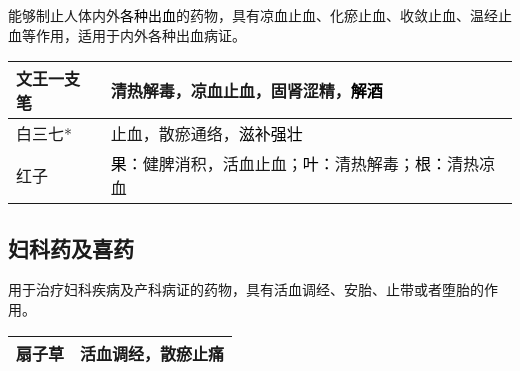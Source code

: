 \documentclass[cn,hazy,black,12pt,normal,founder]{elegantnote}
\newcommand{\redt}[1]{\textcolor{black}{{}#1}}      %
\begin{document}
能够制止人体内外\redt{各种出血}的药物，具有凉血止血、化瘀止血、收敛止血、温经止血等作用，适用于内外各种出血病证。

\begin{table}[H]
  \begin{tabular}{|l|l|}
  \hline
  文王一支笔 & 清热解毒，凉血止血，固肾涩精，\redt{解酒}    \\ \hline
  白三七* & 止血，散瘀通络，\redt{滋补强壮}   \\   \hline
  红子 & \redt{果：}健脾消积，活血止血；\redt{叶：}清热解毒；\redt{根：}清热凉血  \\  \hline
  \end{tabular}
\end{table}

\subsection{妇科药及喜药}

用于治疗妇科疾病及产科病证的药物，具有活血调经、安胎、止带或者堕胎的作用。

\begin{table}[H]
  \begin{tabular}{|l|l|}
  \hline
  扇子草 & 活血调经，散瘀止痛 \\ \hline
  \end{tabular}
\end{table}
\end{document}
